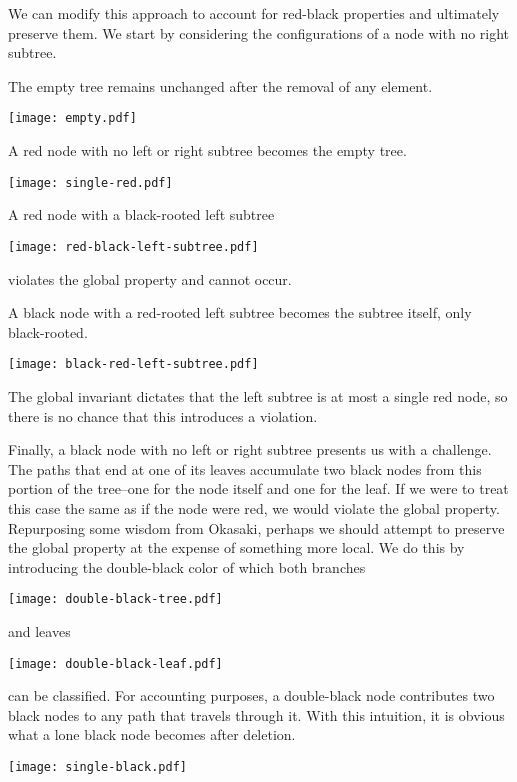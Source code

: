 \documentclass[preprint]{sigplanconf}
\begin{document}
We can modify this approach to account for red-black properties and ultimately preserve them. We start by considering the configurations of a node with no right subtree.

The empty tree remains unchanged after the removal of any element.
\begin{center}
\texttt{[image: empty.pdf]}
\end{center}

A red node with no left or right subtree becomes the empty tree.
\begin{center}
\texttt{[image: single-red.pdf]}
\end{center}

A red node with a black-rooted left subtree
\begin{center}
\texttt{[image: red-black-left-subtree.pdf]}
\end{center}
violates the global property and cannot occur.

A black node with a red-rooted left subtree becomes the subtree itself, only black-rooted.
\begin{center}
\texttt{[image: black-red-left-subtree.pdf]}
\end{center}
The global invariant dictates that the left subtree is at most a single red node, so there is no chance that this introduces a violation.

Finally, a black node with no left or right subtree presents us with a challenge. The paths that end at one of its leaves accumulate two black nodes from this portion of the tree--one for the node itself and one for the leaf. If we were to treat this case the same as if the node were red, we would violate the global property. Repurposing some wisdom from Okasaki, perhaps we should attempt to preserve the global property at the expense of something more local. We do this by introducing the double-black color of which both branches
\begin{center}
\texttt{[image: double-black-tree.pdf]}
\end{center}
and leaves
\begin{center}
\texttt{[image: double-black-leaf.pdf]}
\end{center}
can be classified. For accounting purposes, a double-black node contributes two black nodes to any path that travels through it. With this intuition, it is obvious what a lone black node becomes after deletion. 
\begin{center}
\texttt{[image: single-black.pdf]}
\end{center}
\end{document}
